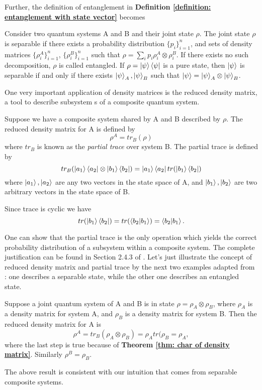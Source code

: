 Further, the definition of entanglement in \textbf{Definition \ref{definition: entanglement with state vector}} becomes 
\begin{definition}[Entanglement] \label{def: entanglement with density matrix}
 Consider two quantum systems A and B and their joint state $\rho$. The joint state $\rho$ is separable if there exists a probability distribution $\{p_i\}_{i=1}^n$, and sets of density matrices $\{\rho_i^A\}_{i=1}^n$, $\{\rho_i^B\}_{i=1}^n$ such that $\rho=\sum_i p_i\rho_i^A\otimes\rho_i^B$.
 If there exists no such decomposition, $\rho$ is called entangled.
 If $\rho=\ket{\psi}\bra{\psi}$ is a pure state, then $\ket{\psi}$ is separable if and only if there exists $\ket{\psi}_A, \ket{\psi}_B$ such that $\ket{\psi}=\ket{\psi}_A \otimes \ket{\psi}_B$.
\end{definition}

One very important application of density matrices is the reduced density matrix, a tool to describe subsystem s of a composite quantum system.
\begin{definition}
 Suppose we have a composite system shared by A and B described by $\rho$. The reduced density matrix for A is defined by
\begin{equation}
    \rho^A=tr_B (\rho)
\end{equation}
where $tr_B$ is known as the \textit{partial trace} over system B. The partial trace is defined by
\begin{equation}
tr_B(\ket{a_1}\bra{a_2} \otimes \ket{b_1} \bra{b_2})=\ket{a_1}\bra{a_2}tr(\ket{b_1}\bra{b_2})
\end{equation}
where $\ket{a_1}, \ket{a_2}$ are any two vectors in the state space of A, and $\ket{b_1}, \ket{b_2}$ are two arbitrary vectors in the state space of B.
\end{definition}


Since trace is cyclic we have
\begin{equation}
 tr(\ket{b_1}\bra{b_2})=tr(\braket{b_2|b_1})=\braket{b_2|b_1}.
\end{equation}

One can show that the partial trace is the only operation which yields the correct probability distribution of a subsystem  within a composite system. The complete justification can be found in Section 2.4.3 of \cite{Nielsen}. 
Let's just illustrate the concept of reduced density matrix and partial trace by the next two examples adapted from \cite{Nielsen}: one describes a separable state, while the other one describes an entangled state.
\begin{example}
Suppose a joint quantum system of A and B is in state $\rho=\rho_A \otimes \rho_B$, where $\rho_A$ is a density matrix for system A, and $\rho_B$ is a density matrix for system B. Then the reduced density matrix for A is
\begin{equation}
    \rho^A=tr_B (\rho_A \otimes \rho_B)=\rho_A tr(\rho_B=\rho_A,
\end{equation}
where the last step is true because of \textbf{Theorem \ref{thm: char of density matrix}}.
Similarly $\rho^B=\rho_B$.
\end{example}
The above result is consistent with our intuition that comes from separable composite systems.


